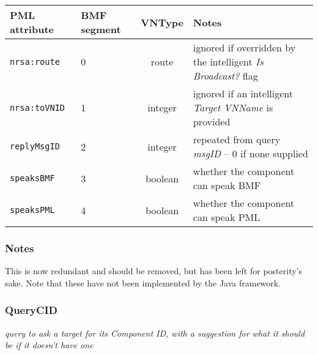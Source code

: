 \documentclass[pdftex,a4paper]{article}
\newcommand{\XMLfont}[1]{{\tt \small #1}}
\begin{document}
\begin{table}[!h]
  \begin{center}
    \label{tab:ReplyCID}
    \begin{tabular}{|l|p{13mm}|c|p{60mm}|}
      \hline

      \textbf{PML attribute} & \textbf{BMF segment} & \textbf{VNType}
      & \textbf{Notes} \\\hline

      \XMLfont{nrsa:route} & 0 & route & ignored if overridden by the
      intelligent {\em Is Broadcast?} flag \\ \hline

      \XMLfont{nrsa:toVNID} & 1 & integer & ignored if an intelligent {\em
      Target VNName} is provided \\\hline

      \XMLfont{replyMsgID} & 2 & integer & repeated from query {\em
      msgID} -- 0 if none supplied \\\hline

      \XMLfont{speaksBMF} & 3 & boolean & whether the component
      can speak BMF \\\hline

      \XMLfont{speaksPML} & 4 & boolean & whether the component
      can speak PML \\\hline

    \end{tabular}
  \end{center}
\end{table}

\subsubsection*{Notes}
This is now redundant and should be removed, but has been left for posterity's
sake. Note that these have not been implemented by the Java framework.

\clearpage

\subsubsection{QueryCID}
{\em query to ask a target for its Component ID, with a suggestion for
  what it should be if it doesn't have one}
\end{document}
